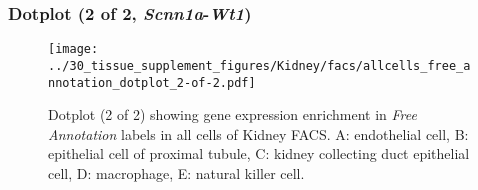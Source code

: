 \clearpage

\subsubsection{Dotplot (2 of 2, \emph{Scnn1a}-\emph{Wt1})}
\begin{figure}[h]
\centering
\texttt{[image: ../30\_tissue\_supplement\_figures/Kidney/facs/allcells\_free\_annotation\_dotplot\_2-of-2.pdf]}

\caption{ Dotplot (2 of 2)  showing gene expression enrichment in \emph{Free Annotation} labels in all cells of Kidney FACS. A: endothelial cell, B: epithelial cell of proximal tubule, C: kidney collecting duct epithelial cell, D: macrophage, E: natural killer cell.}
\end{figure}

